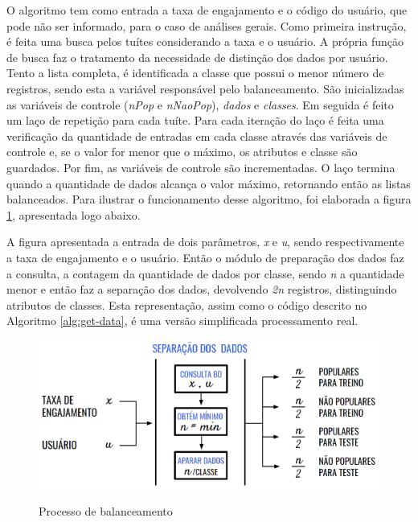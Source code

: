 \documentclass[oneside,openright,12pt]{ufsm_2015} %
\begin{document}
    \par O algoritmo tem como entrada a taxa de engajamento e o código do usuário, que pode não ser informado, para o caso de análises gerais. Como primeira instrução, é feita uma busca pelos tuítes considerando a taxa e o usuário. A própria função de busca faz o tratamento da necessidade de distinção dos dados por usuário. Tento a lista completa, é identificada a classe que possui o menor número de registros, sendo esta a variável responsável pelo balanceamento. São inicializadas as variáveis de controle (\textit{nPop} e \textit{nNaoPop}), \textit{dados} e \textit{classes}. Em seguida é feito um laço de repetição para cada tuíte. Para cada iteração do laço é feita uma verificação da quantidade de entradas em cada classe através das variáveis de controle e, se o valor for menor que o máximo, os atributos e classe são guardados. Por fim, as variáveis de controle são incrementadas. O laço termina quando a quantidade de dados alcança o valor máximo, retornando então as listas balanceados. Para ilustrar o funcionamento desse algoritmo, foi elaborada a figura \ref{fig:balanceamento}, apresentada logo abaixo.
    
    \par A figura apresentada a entrada de dois parâmetros, \textit{x} e \textit{u}, sendo respectivamente a taxa de engajamento e o usuário. Então o módulo de preparação dos dados faz a consulta, a contagem da quantidade de dados por classe, sendo \textit{n} a quantidade menor e então faz a separação dos dados, devolvendo \textit{2n} registros, distinguindo atributos de classes. Esta representação, assim como o código descrito no Algoritmo \ref{alg:get-data}, é uma versão simplificada processamento real. %
    
    \begin{figure}[H]
        \caption{Processo de balanceamento}
        \centering
        \includegraphics[width=1\textwidth]{figuras/balanceamento.png}
        \vspace{\baselineskip} %
        \label{fig:balanceamento}
    \end{figure}
\end{document}
